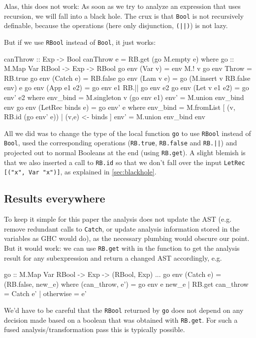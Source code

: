 \documentclass[manuscript,anonymous,screen,acmsmall]{acmart}
\begin{document}
Alas, this does not work: As soon as we try to analyze an expression that uses recursion, we will fall into a black hole. The crux is that \verb|Bool| is not recursively definable, because the operations (here only disjunction, \verb+(||)+) is not lazy.

But if we use \verb|RBool| instead of \verb|Bool|, it just works:
\begin{code}
canThrow :: Exp -> Bool
canThrow e = RB.get (go M.empty e)
  where
    go :: M.Map Var RBool -> Exp -> RBool
    go env (Var v)          = env M.! v
    go env Throw            = RB.true
    go env (Catch e)        = RB.false
    go env (Lam v e)        = go (M.insert v RB.false env) e
    go env (App e1 e2)      = go env e1 RB.|| go env e2
    go env (Let v e1 e2)    = go env' e2
      where
        env_bind  = M.singleton v (go env e1)
        env'      = M.union env_bind env
    go env (LetRec binds e) = go env' e
      where
        env_bind  = M.fromList [ (v, RB.id (go env' e)) | (v,e) <- binds ]
        env'      = M.union env_bind env
\end{code}
All we did was to change the type of the local function \verb|go| to use \verb|RBool| instead of \verb|Bool|, used the corresponding operations (\verb|RB.true|, \verb|RB.false| and \verb+RB.||+) and  projected out to normal Booleans at the end (using \verb|RB.get|). A slight blemish is that we also inserted a call to \verb|RB.id| so that we don't fall over the input \verb|LetRec [("x", Var "x")]|, as explained in \cref{sec:blackhole}.

\subsection{Results everywhere}

To keep it simple for this paper the analysis does not update the AST (e.g. remove redundant calls to \verb|Catch|, or update analysis information stored in the variables as GHC would do), as the necessary plumbing would obscure our point. But it would work: we can use \verb|RB.get|  with in the function to get the analysis result for any subexpression and return a changed AST accordingly, e.g.
\begin{code}
    go :: M.Map Var RBool -> Exp -> (RBool, Exp)
    ...
    go env (Catch e)        = (RB.false, new_e)
      where
        (can_throw, e') = go env e
        new_e  |  RB.get can_throw  = Catch e'
               |  otherwise         = e'
\end{code}
We'd have to be careful that the \verb|RBool| returned by \verb|go| does not depend on any decision made based on a boolean that was obtained with \verb|RB.get|. For such a fused analysis/transformation pass this is typically possible.
\end{document}
